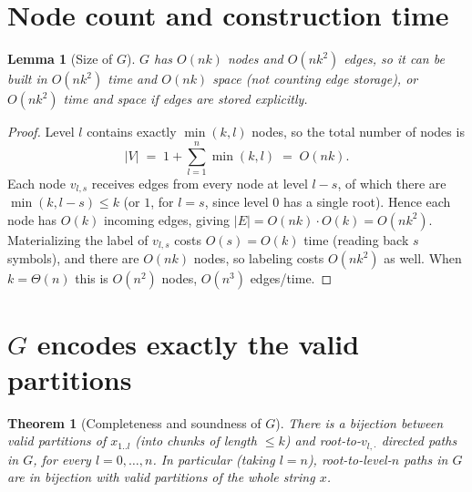 \documentclass[11pt]{article}
\newtheorem{theorem}{Theorem}
\newtheorem{lemma}{Lemma}
\begin{document}
\section{Node count and construction time}

\begin{lemma}[Size of $G$]
$G$ has $O(nk)$ nodes and $O(nk^2)$ edges, so it can be built in $O(nk^2)$ time and
$O(nk)$ space (not counting edge storage), or $O(nk^2)$ time and space if edges are
stored explicitly.
\end{lemma}

\begin{proof}
Level $l$ contains exactly $\min(k, l)$ nodes, so the total number of nodes is
\[
  |V| \;=\; 1 + \sum_{l=1}^{n} \min(k, l) \;=\; O(nk).
\]
Each node $v_{l,s}$ receives edges from every node at level $l-s$, of which there are
$\min(k, l - s) \le k$ (or $1$, for $l = s$, since level $0$ has a single root). Hence
each node has $O(k)$ incoming edges, giving $|E| = O(nk) \cdot O(k) = O(nk^2)$.
Materializing the label of $v_{l,s}$ costs $O(s) = O(k)$ time (reading back $s$
symbols), and there are $O(nk)$ nodes, so labeling costs $O(nk^2)$ as well. When
$k = \Theta(n)$ this is $O(n^2)$ nodes, $O(n^3)$ edges/time.
\end{proof}

\section{$G$ encodes exactly the valid partitions}

\begin{theorem}[Completeness and soundness of $G$]
\label{thm:complete}
There is a bijection between valid partitions of $x_{1..l}$ (into chunks of length
$\le k$) and root-to-$v_{l,\cdot}$ directed paths in $G$, for every $l = 0, \dots, n$.
In particular (taking $l = n$), root-to-level-$n$ paths in $G$ are in bijection with
valid partitions of the whole string $x$.
\end{theorem}
\end{document}
